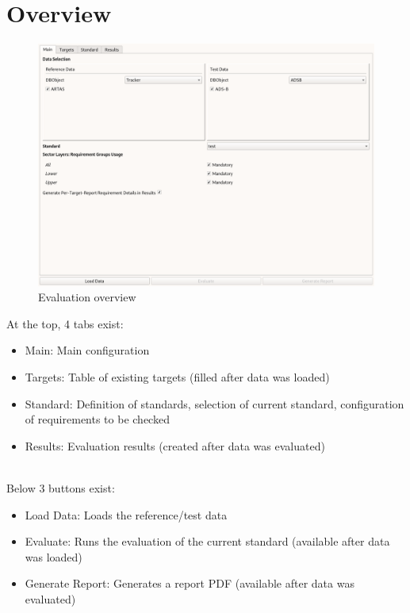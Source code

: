 \section{Overview}
\label{sec:eval_overview} 

\begin{figure}[H]
  \hspace*{-2cm}
    \includegraphics[width=18cm,frame]{../screenshots/eval_overview.png}
  \caption{Evaluation overview}
\end{figure}

At the top, 4 tabs exist:
\begin{itemize}  
\item Main: Main configuration
\item Targets: Table of existing targets (filled after data was loaded)
\item Standard: Definition of standards, selection of current standard, configuration of requirements to be checked
\item Results: Evaluation results (created after data was evaluated)
\end{itemize}
\ \\

Below 3 buttons exist:
\begin{itemize}  
\item Load Data: Loads the reference/test data
\item Evaluate: Runs the evaluation of the current standard (available after data was loaded)
\item Generate Report: Generates a report PDF (available after data was evaluated)
\end{itemize}
\ \\

